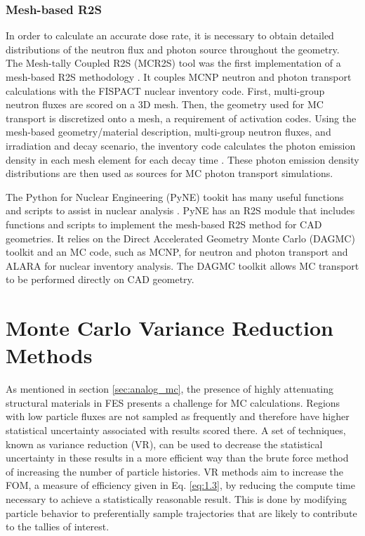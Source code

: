 \subsubsection{Mesh-based R2S}
In order to calculate an accurate dose rate, it is necessary to obtain
detailed distributions of the neutron flux and photon source
throughout the geometry.
The Mesh-tally Coupled R2S (MCR2S) tool was the first implementation of a mesh-based R2S methodology
\cite{mcr2s}.  It couples MCNP neutron and photon transport calculations with
the FISPACT nuclear inventory code. First, multi-group neutron fluxes are
scored on a 3D mesh.
Then, the geometry used for MC
transport is discretized onto a mesh, a requirement of activation codes.  Using
the mesh-based geometry/material description,
multi-group neutron fluxes, and irradiation and decay scenario, the inventory code
calculates the photon emission density in each mesh element for each decay time
\cite{mcr2s}.  These photon emission density distributions are then used as
sources for MC photon transport simulations.  

The Python for Nuclear Engineering (PyNE) tookit has many useful functions and
scripts to assist in nuclear analysis \cite{pyne}. 
PyNE has an R2S module \cite{mesh_r2s} that includes functions and scripts to 
implement the mesh-based R2S method for CAD
geometries.  It relies on the Direct Accelerated Geometry Monte Carlo (DAGMC) toolkit and an MC
code, such as MCNP, for neutron and
photon transport and ALARA \cite{alara} for nuclear inventory analysis.  
The DAGMC toolkit allows MC transport to be performed directly on CAD geometry.

\section{Monte Carlo Variance Reduction Methods}\label{sec:vr_methods}

As mentioned in section \ref{sec:analog_mc}, the presence of highly attenuating
structural materials in 
FES presents a challenge for MC calculations.
Regions with low particle fluxes are not sampled as frequently and therefore
have higher statistical uncertainty associated with results scored there.
A set of techniques, known as variance reduction (VR), can be used to decrease
the statistical uncertainty in these results in a more efficient way than the
brute force method of increasing the number of particle histories.
VR methods aim to increase the FOM, a measure of efficiency given
in Eq. \ref{eq:1.3}, by reducing the compute time 
necessary to achieve a statistically reasonable result.
This is done by modifying particle behavior to preferentially sample trajectories that are likely to
contribute to the tallies of interest.

